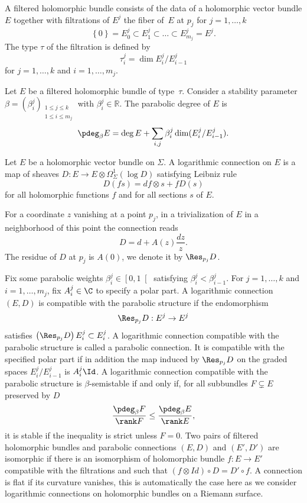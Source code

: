 \begin{definition}
A filtered holomorphic bundle consists of the data of a holomorphic vector bundle $E$ together with filtrations of $E^j$ the fiber of~$E$ at $p_j$ for $j=1,\dots,k$
\[
\left\lbrace 0\right \rbrace = E^j_0 \subset E^j_1\subset\dots\subset E^j_{m_j} = E^j.
\]
The type $\tau$ of the filtration is defined by
\[
\tau^j_i =\dim E^j_i/E^j_{i-1}
\]
for $j=1,\dots,k$ and $i=1,\dots,m_j$.
\end{definition}
\begin{definition}
Let $E$ be a filtered holomorphic bundle of type~$\tau$. Consider a stability parameter $\beta=(\beta^j_i)_{\substack{1\le j \le k \\ 1 \le i \le m_j}}$ with $\beta_i^j\in\mathbb{R}$. The parabolic degree of $E$ is
\[
\pdeg_{\beta} E =\deg E + \sum_{i,j} \beta^j_i \dim(E^j_i/E^j_{i-1}).
\]
\end{definition}

Let $E$ be a holomorphic vector bundle on $\Sigma$. A logarithmic connection on $E$ is a map of sheaves $D: E\to E\otimes \Omega^1_{\Sigma}(\log D)$ satisfying Leibniz rule
\[
D(f s) = df\otimes s + f D(s)
\]
for all holomorphic functions $f$ and for all sections $s$ of $E$.

For a coordinate $z$ vanishing at a point $p_j$, in a trivialization of $E$ in a neighborhood of this point the connection reads
\[
D = d + A(z) \frac{d z}{z}.
\]
The residue of $D$ at $p_j$ is $A(0)$, we denote it by $\Res_{p_j} D$.

Fix some parabolic weights $\beta^j_i\in \left[ 0, 1\right[$ satisfying $\beta^j_i < \beta^j_{i-1}$. For $j=1,\dots, k$ and $i=1,\dots,m_j$, fix $A^j_i \in \C$ to specify a polar part. A logarithmic connection $(E,D)$ is compatible with the parabolic structure if the endomorphism
\[
\Res_{p_j} D : E^j \to E^j
\]
satisfies $\left(\Res_{p_j} D\right) E^j_i \subset E^j_{i}$. A logarithmic connection compatible with the parabolic structure is called a parabolic connection. It is compatible with the specified polar part if in addition the map induced by $\Res_{p_j} D$ on the graded spaces $ E^j_i/E^j_{i-1} $ is $A^j_i \Id$.
A logarithmic connection compatible with the parabolic structure is $\beta$-semistable if and only if, for all subbundles $F\subsetneq E$ preserved by $D$
\[
\frac{\pdeg_{\beta} F}{\rank F} \le \frac{\pdeg_{\beta} E}{\rank E},
\]
it is stable if the inequality is strict unless $F=0$. Two pairs of filtered holomorphic bundles and parabolic connections $(E,D)$ and $(E',D')$ are isomorphic if there is an isomorphism of holomorphic bundle $f:E\to E'$ compatible with the filtrations and such that $\left(f\otimes Id\right)\circ D = D'\circ f$. A connection is flat if its curvature vanishes, this is automatically the case here as we consider logarithmic connections on holomorphic bundles on a Riemann surface.

